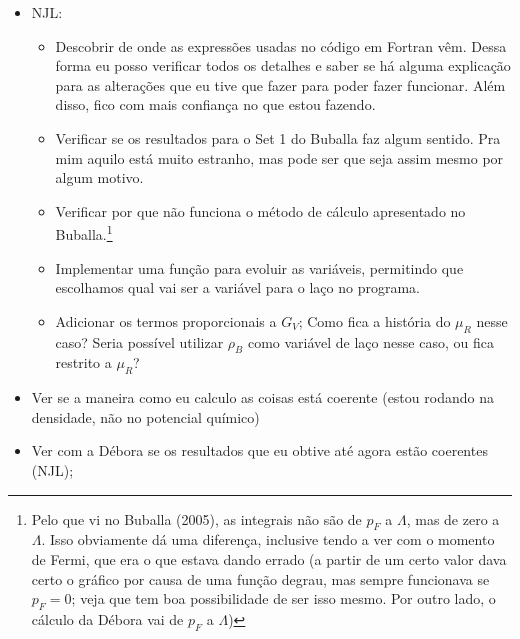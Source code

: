 \begin{itemize}
	\item NJL:
		\begin{itemize}
			\item Descobrir de onde as expressões usadas no código em Fortran vêm. Dessa forma eu posso verificar todos os detalhes e saber se há alguma explicação para as alterações que eu tive que fazer para poder fazer funcionar. Além disso, fico com mais confiança no que estou fazendo.
			\item Verificar se os resultados para o Set 1 do Buballa faz algum sentido. Pra mim aquilo está muito estranho, mas pode ser que seja assim mesmo por algum motivo.
			\item Verificar por que não funciona o método de cálculo apresentado no Buballa.\footnote{Pelo que vi no Buballa (2005), as integrais não são de $p_F$ a $\Lambda$, mas de zero a $\Lambda$. Isso obviamente dá uma diferença, inclusive tendo a ver com o momento de Fermi, que era o que estava dando errado (a partir de um certo valor dava certo o gráfico por causa de uma função degrau, mas sempre funcionava se $p_F = 0$; veja que tem boa possibilidade de ser isso mesmo. Por outro lado, o cálculo da Débora vai de $p_F$ a $\Lambda$)}
			\item Implementar uma função para evoluir as variáveis, permitindo que escolhamos qual vai ser a variável para o laço no programa.
			\item Adicionar os termos proporcionais a $G_V$; Como fica a história do $\mu_R$ nesse caso? Seria possível utilizar $\rho_B$ como variável de laço nesse caso, ou fica restrito a $\mu_R$?
		\end{itemize}
	\item Ver se a maneira como eu calculo as coisas está coerente (estou rodando na densidade, não no potencial químico)
	\item Ver com a Débora se os resultados que eu obtive até agora estão coerentes (NJL);
\end{itemize}
